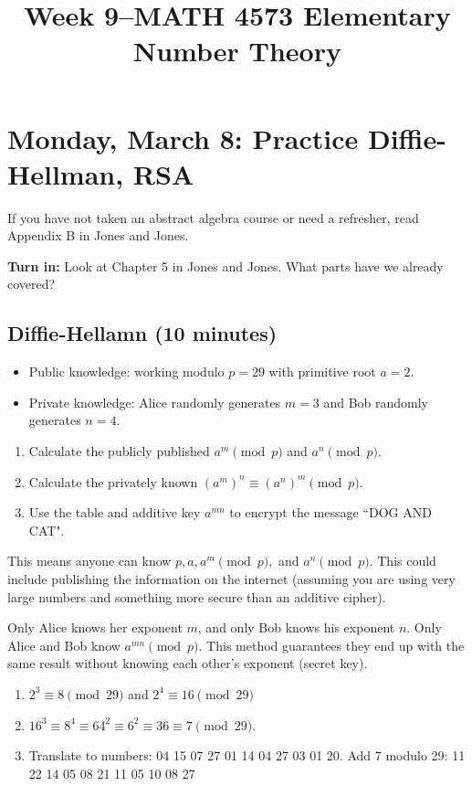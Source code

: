 \documentclass[letterpaper, 11 pt]{article}
\title{Week 9--MATH 4573 Elementary Number Theory}
\begin{document}
\maketitle
\tableofcontents
\section{Monday, March 8: Practice Diffie-Hellman, RSA}
If you have not taken an abstract algebra course or need a refresher, read Appendix B in Jones and Jones.

{\bf Turn in:} Look at Chapter 5 in Jones and Jones. What parts have we already covered?
\subsection{Diffie-Hellamn (10 minutes)}
\begin{br}[10 minutes]
\begin{itemize}
 \item  Public knowledge: working modulo $p=29$ with primitive root $a=2$.
\item Private knowledge: Alice randomly generates $m=3$ and Bob randomly generates $n=4$.
\end{itemize}
\begin{enumerate}
 \item Calculate the publicly published $a^m\pmod p$ and $a^n\pmod p$.
 \item Calculate the privately known $(a^m)^n\equiv (a^n)^m \pmod p$.
 \item Use the table and additive key $a^{mn}$ to encrypt the message ``DOG AND CAT".
\end{enumerate}
\end{br}
This means anyone can know $p,a,a^m\pmod p,$ and $a^n\pmod p$. This could include publishing the information on the internet (assuming you are using very large numbers and something more secure than an additive cipher).

Only Alice knows her exponent $m$, and only Bob knows his exponent $n$. Only Alice and Bob know $a^{mn}\pmod p$. This method guarantees they end up with the same result without knowing each other's exponent (secret key).

\begin{solution}
 
\begin{enumerate}
 \item $2^{3} \equiv 8\pmod 29$ and $2^4 \equiv 16\pmod 29$
 \item $16^3\equiv 8^4\equiv 64^2\equiv 6^2 \equiv 36\equiv 7 \pmod 29$.
 \item Translate to numbers: 04 15 07 27 01 14 04 27 03 01 20. Add 7 modulo 29: 11 22 14 05 08 21 11 05 10 08 27\qedhere
\end{enumerate}
\end{solution}
\end{document}
